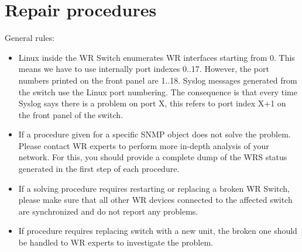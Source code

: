 \section{Repair procedures}

General rules:
\begin{itemize}
  \item Linux inside the WR Switch enumerates WR interfaces starting from 0.
    This means we have to use internally port indexes 0..17. However, the
    port numbers printed on the front panel are 1..18. Syslog messages
    generated from the switch use the Linux port numbering. The consequence is
    that every time Syslog says there is a problem on port X, this refers to
    port index X+1 on the front panel of the switch.
  \item If a procedure given for a specific SNMP object does not solve the
    problem. Please contact WR experts to perform more in-depth analysis of your
    network. For this, you should provide a complete dump of the WRS status
    generated in the first step of each procedure.
  \item If a solving procedure requires restarting or replacing a broken WR
    Switch, please make sure that all other WR devices connected to the affected
    switch are synchronized and do not report any problems.
  \item If procedure requires replacing switch with a new unit, the broken one
    should be handled to WR experts to investigate the problem.
\end{itemize}


